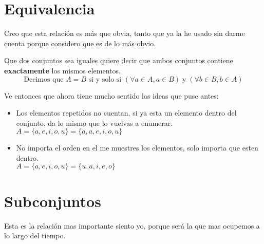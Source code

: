 \documentclass[12pt, fleqn]{report}                             %
\theoremstyle{break}                                            %
\begin{document}
        \section{Equivalencia}

            Creo que esta relación es más que obvia, tanto que ya la he usado sin darme cuenta
            porque considero que es de lo más obvio.

            Que dos conjuntos sea iguales quiere decir que ambos conjuntos contiene
            \textbf{exactamente} los mismos elementos.
            \begin{equation*}
                \text{Decimos que }
                A = B 
                \text{ si y solo si }
                (\forall a \in A, a \in B) \;\text{y}\; (\forall b \in B, b \in A)
            \end{equation*}

            Ve entonces que ahora tiene mucho sentido las ideas que puse antes:

            \begin{itemize}
                \item Los elementos repetidos no cuentan, si ya esta un elemento dentro del
                    conjunto, da lo mismo que lo vuelvas a enumerar.\\
                    $A = \{a, e, i, o, u\} = \{a, a, e, i, o, u\}$

                \item No importa el orden en el me muestres los elementos,
                    solo importa que esten dentro.\\
                    $A = \{a, e, i, o, u\} = \{u, a, i, e, o\}$
            \end{itemize}


        \clearpage
        \section{Subconjuntos}

            Esta es la relación mas importante siento yo, porque será la que mas ocupemos a lo largo
            del tiempo.
\end{document}
